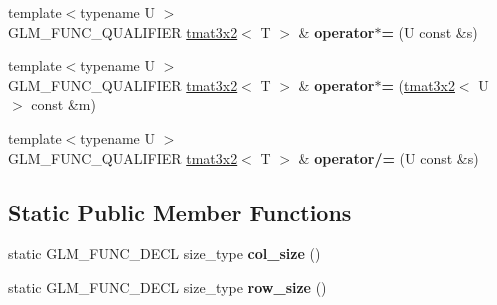 \begin{DoxyCompactItemize}
\item 
\hypertarget{structglm_1_1detail_1_1tmat3x2_a06989065ea74650cd09e1be9a496770b}{{\footnotesize template$<$typename U $>$ }\\G\-L\-M\-\_\-\-F\-U\-N\-C\-\_\-\-Q\-U\-A\-L\-I\-F\-I\-E\-R \hyperlink{structglm_1_1detail_1_1tmat3x2}{tmat3x2}$<$ T $>$ \& {\bfseries operator$\ast$=} (U const \&s)}\label{structglm_1_1detail_1_1tmat3x2_a06989065ea74650cd09e1be9a496770b}

\item 
\hypertarget{structglm_1_1detail_1_1tmat3x2_aa1aff25eeaa4680c3e78d65a2485e4fd}{{\footnotesize template$<$typename U $>$ }\\G\-L\-M\-\_\-\-F\-U\-N\-C\-\_\-\-Q\-U\-A\-L\-I\-F\-I\-E\-R \hyperlink{structglm_1_1detail_1_1tmat3x2}{tmat3x2}$<$ T $>$ \& {\bfseries operator$\ast$=} (\hyperlink{structglm_1_1detail_1_1tmat3x2}{tmat3x2}$<$ U $>$ const \&m)}\label{structglm_1_1detail_1_1tmat3x2_aa1aff25eeaa4680c3e78d65a2485e4fd}

\item 
\hypertarget{structglm_1_1detail_1_1tmat3x2_a1aee04248ee1f4251f278821b60f0b73}{{\footnotesize template$<$typename U $>$ }\\G\-L\-M\-\_\-\-F\-U\-N\-C\-\_\-\-Q\-U\-A\-L\-I\-F\-I\-E\-R \hyperlink{structglm_1_1detail_1_1tmat3x2}{tmat3x2}$<$ T $>$ \& {\bfseries operator/=} (U const \&s)}\label{structglm_1_1detail_1_1tmat3x2_a1aee04248ee1f4251f278821b60f0b73}

\end{DoxyCompactItemize}
\subsection*{Static Public Member Functions}
\begin{DoxyCompactItemize}
\item 
\hypertarget{structglm_1_1detail_1_1tmat3x2_ad7d1e84cf2bece265c157fa05ded68ae}{static G\-L\-M\-\_\-\-F\-U\-N\-C\-\_\-\-D\-E\-C\-L size\-\_\-type {\bfseries col\-\_\-size} ()}\label{structglm_1_1detail_1_1tmat3x2_ad7d1e84cf2bece265c157fa05ded68ae}

\item 
\hypertarget{structglm_1_1detail_1_1tmat3x2_a5a957db4e6d70144fafa69398f66fa34}{static G\-L\-M\-\_\-\-F\-U\-N\-C\-\_\-\-D\-E\-C\-L size\-\_\-type {\bfseries row\-\_\-size} ()}\label{structglm_1_1detail_1_1tmat3x2_a5a957db4e6d70144fafa69398f66fa34}

\end{DoxyCompactItemize}


